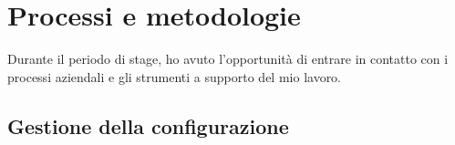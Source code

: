 
\chapter{Processi e metodologie}
\label{cap:processi-metodologie}

Durante il periodo di stage, ho avuto l'opportunità di entrare in contatto con i processi aziendali e gli strumenti a supporto del mio lavoro.

\section{Gestione della configurazione}

